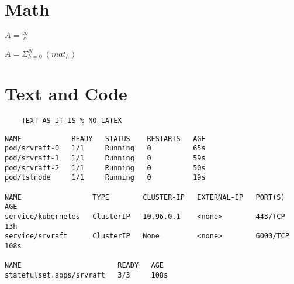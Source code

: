 \documentclass{article}
\begin{document}
\section{Math}
$A = \frac{\infty}{\alpha}$

$A = \Sigma_{h=0}^{N} \ (mat_h)$

\section{Text and Code}

\begin{verbatim}
    TEXT AS IT IS % NO LATEX
\end{verbatim}

\begin{verbatim}
NAME            READY   STATUS    RESTARTS   AGE
pod/srvraft-0   1/1     Running   0          65s
pod/srvraft-1   1/1     Running   0          59s
pod/srvraft-2   1/1     Running   0          50s
pod/tstnode     1/1     Running   0          19s
 
NAME                 TYPE        CLUSTER-IP   EXTERNAL-IP   PORT(S)    AGE
service/kubernetes   ClusterIP   10.96.0.1    <none>        443/TCP    13h
service/srvraft      ClusterIP   None         <none>        6000/TCP   108s
 
NAME                       READY   AGE
statefulset.apps/srvraft   3/3     108s
\end{verbatim}



% 
\end{document}
